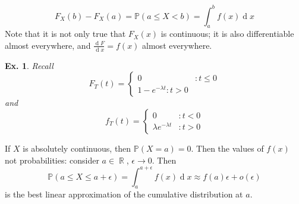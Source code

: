 \documentclass[12pt, a4paper]{book}
\DeclareMathOperator{\R}{\mathbb{R}}
\renewcommand{\Pr}{\mathbb{P}}
\renewcommand{\d}[1]{\ensuremath{\operatorname{d}\!{#1}}} %
\newtheorem{example}[theorem]{Ex.}
\theoremstyle{nonumberplain}
\begin{document}
\[F_X(b)-F_X(a)=\Pr(a\leq X<b)=\int_a^b f(x)\d{x}\]
Note that it is not only true that $F_X(x)$ is continuous; it is also differentiable almost everywhere, and $\frac{\d{F}}{\d{x}}=f(x)$ almost everywhere.
\begin{example}
    Recall
    \[F_T(t)=
        \begin{cases}
            0 &: t\leq 0\\
            1-e^{-\lambda t}: t>0
        \end{cases}
    \]
    and
    \[f_T(t)=
        \begin{cases}
            0 &: t<0\\
            \lambda e^{-\lambda t} &:t >0
        \end{cases}
    \]
\end{example}
If $X$ is absolutely continuous, then $\Pr(X=a)=0$.
Then the values of $f(x)$ not probabilities: consider $a\in\R$, $\epsilon\to 0$.
Then
\[\Pr(a\leq X\leq a+\epsilon)=\int_a^{a+\epsilon}f(x)\d{x}\approx f(a)\epsilon+o(\epsilon)\]
is the best linear approximation of the cumulative distribution at $a$.
\end{document}
